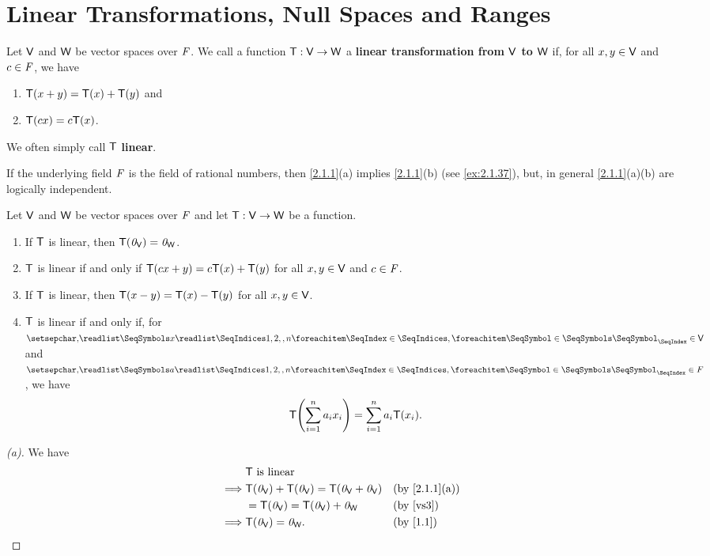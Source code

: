 \section{Linear Transformations, Null Spaces and Ranges}\label{sec:2.1}

\begin{defn}\label{2.1.1}
  Let \(\mathsf{V}\) and \(\mathsf{W}\) be vector spaces over \(\mathit{F}\).
  We call a function \(\mathsf{T} : \mathsf{V} \to \mathsf{W}\) a \textbf{linear transformation from \(\mathsf{V}\) to \(\mathsf{W}\)} if, for all \(x, y \in \mathsf{V}\) and \(c \in \mathit{F}\), we have
  \begin{enumerate}
    \item \(\mathsf{T}(x + y) = \mathsf{T}(x) + \mathsf{T}(y)\) and
    \item \(\mathsf{T}(cx) = c\mathsf{T}(x)\).
  \end{enumerate}
  We often simply call \(\mathsf{T}\) \textbf{linear}.
\end{defn}

\begin{note}
  If the underlying field \(\mathit{F}\) is the field of rational numbers, then \cref{2.1.1}(a) implies \cref{2.1.1}(b) (see \cref{ex:2.1.37}), but, in general \cref{2.1.1}(a)(b) are logically independent.
\end{note}

\begin{prop}\label{2.1.2}
  Let \(\mathsf{V}\) and \(\mathsf{W}\) be vector spaces over \(\mathit{F}\) and let \(\mathsf{T} : \mathsf{V} \to \mathsf{W}\) be a function.
  \begin{enumerate}
    \item If \(\mathsf{T}\) is linear, then \(\mathsf{T}(\mathit{0}_{\mathsf{V}}) = \mathit{0}_{\mathsf{W}}\).
    \item \(\mathsf{T}\) is linear if and only if \(\mathsf{T}(cx + y) = c\mathsf{T}(x) + \mathsf{T}(y)\) for all \(x, y \in \mathsf{V}\) and \(c \in \mathit{F}\).
    \item If \(\mathsf{T}\) is linear, then \(\mathsf{T}(x - y) = \mathsf{T}(x) - \mathsf{T}(y)\) for all \(x, y \in \mathsf{V}\).
    \item \(\mathsf{T}\) is linear if and only if, for \(\seq{x}{1,2,,n} \in \V\) and \(\seq{a}{1,2,,n} \in F\), we have
          \[
            \T\pa{\sum_{i = 1}^n a_i x_i} = \sum_{i = 1}^n a_i \T(x_i).
          \]
  \end{enumerate}
\end{prop}

\begin{proof}[(a)]
  We have
  \begin{align*}
             & \T \text{ is linear}                                                                   \\
    \implies & \T(\zv_{\V}) + \T(\zv_{\V}) = \T(\zv_{\V} + \zv_{\V}) &  & \text{(by \cref{2.1.1}(a))} \\
             & = \T(\zv_{\V}) = \T(\zv_{\V}) + \zv_{\W}              &  & \text{(by \ref{vs3})}       \\
    \implies & \T(\zv_{\V}) = \zv_{\W}.                              &  & \text{(by \cref{1.1})}
  \end{align*}
\end{proof}


